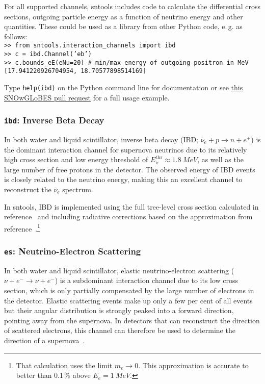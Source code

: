 \documentclass[11pt, oneside]{article}
\newcommand{\nuebar}{\ensuremath{\bar{\nu}_e}\xspace}
\begin{document}
For all supported channels, sntools includes code to calculate the differential cross sections, outgoing particle energy as a function of neutrino energy and other quantities.
These could be used as a library from other Python code, e.\,g. as follows:\\
\texttt{>> from sntools.interaction\_channels import ibd}\\
\texttt{>> c = ibd.Channel('eb')}\\
\texttt{>> c.bounds\_eE(eNu=20)  \# min/max energy of outgoing positron in MeV}\\
\texttt{[17.941220926704954, 18.70577898514169]}

Type \texttt{help(ibd)} on the Python command line for documentation or see \href{https://github.com/SNOwGLoBES/snowglobes/pull/12/commits/f1cf96d8c326b99ac35474bb6a36ef4d1fde809d}{this SNOwGLoBES pull request} for a full usage example.


\subsubsection{\texttt{ibd}: Inverse Beta Decay}
In both water and liquid scintillator, inverse beta decay (IBD; $\nuebar + p \rightarrow n + e^+$) is the dominant interaction channel for supernova neutrinos due to its relatively high cross section and low energy threshold of $E_\nu^\text{thr} \approx \SI{1.8}{MeV}$, as well as the large number of free protons in the detector.
The observed energy of IBD events is closely related to the neutrino energy, making this an excellent channel to reconstruct the \nuebar spectrum.

In sntools, IBD is implemented using the full tree-level cross section calculated in reference~\cite{Strumia2003} and including radiative corrections based on the approximation from reference~\cite{Kurylov2003}.\footnote{That calculation uses the limit $m_e \rightarrow 0$. This approximation is accurate to better than 0.1\,\% above $E_e = \SI{1}{MeV}$.}


\subsubsection{\texttt{es}: Neutrino-Electron Scattering}
In both water and liquid scintillator, elastic neutrino-electron scattering  ($\nu + e^- \rightarrow \nu + e^-$) is a subdominant interaction channel due to its low cross section, which is only partially compensated by the large number of electrons in the detector.
Elastic scattering events make up only a few per cent of all events but their angular distribution is strongly peaked into a forward direction, pointing away from the supernova.
In detectors that can reconstruct the direction of scattered electrons, this channel can therefore be used to determine the direction of a supernova~\cite{Abe2016,HKDR2018}.
\end{document}
